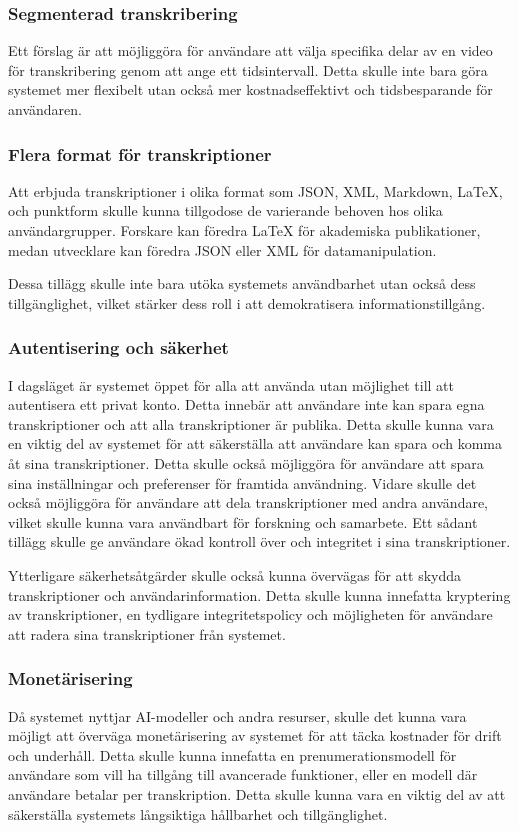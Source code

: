 \subsubsection{Segmenterad transkribering}
Ett förslag är att möjliggöra för användare att
välja specifika delar av en video för transkribering genom att ange ett
tidsintervall. Detta skulle inte bara göra systemet mer flexibelt utan också
mer kostnadseffektivt och tidsbesparande för användaren.

\subsubsection{Flera format för transkriptioner}
Att erbjuda transkriptioner i olika format som JSON, XML, Markdown, LaTeX, och
punktform skulle kunna tillgodose de varierande behoven hos olika
användargrupper. Forskare kan föredra LaTeX för akademiska publikationer, medan
utvecklare kan föredra JSON eller XML för datamanipulation.

Dessa tillägg skulle inte bara utöka systemets användbarhet utan också dess
tillgänglighet, vilket stärker dess roll i att demokratisera
informationstillgång.

\subsubsection{Autentisering och säkerhet}
I dagsläget är systemet öppet för alla att använda utan möjlighet till
att autentisera ett privat konto. Detta innebär att användare inte kan spara
egna transkriptioner och att alla transkriptioner är publika. Detta skulle
kunna vara en viktig del av systemet för att säkerställa att användare kan
spara och komma åt sina transkriptioner. Detta skulle också möjliggöra för
användare att spara sina inställningar och preferenser för framtida användning.
Vidare skulle det också möjliggöra för användare att dela transkriptioner med
andra användare, vilket skulle kunna vara användbart för forskning och
samarbete. Ett sådant tillägg skulle ge användare ökad kontroll över och
integritet i sina transkriptioner.

Ytterligare säkerhetsåtgärder skulle också kunna övervägas för att skydda
transkriptioner och användarinformation. Detta skulle kunna innefatta
kryptering av transkriptioner, en tydligare integritetspolicy och möjligheten
för användare att radera sina transkriptioner från systemet.

\subsubsection{Monetärisering}
Då systemet nyttjar AI-modeller och andra resurser, skulle det kunna vara
möjligt att överväga monetärisering av systemet för att täcka kostnader för
drift och underhåll. Detta skulle kunna innefatta en prenumerationsmodell för
användare som vill ha tillgång till avancerade funktioner, eller en modell
där användare betalar per transkription. Detta skulle kunna vara en viktig del
av att säkerställa systemets långsiktiga hållbarhet och tillgänglighet.

